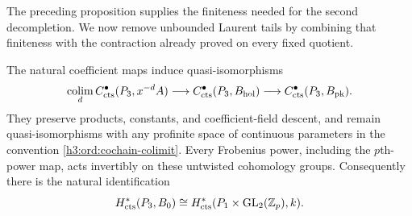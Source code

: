 The preceding proposition supplies the finiteness needed for the second
decompletion.  We now remove unbounded Laurent tails by combining that
finiteness with the contraction already proved on every fixed quotient.

\begin{theorem}\label{h3:thm:ordinary-comparison}
The natural coefficient maps induce quasi-isomorphisms
\begin{equation}\label{h3:ord:natural-comparison}
 \operatorname*{colim}_d C^\bullet_{\mathrm{cts}}(P_3,x^{-d}A)
 \longrightarrow C^\bullet_{\mathrm{cts}}(P_3,B_{\mathrm{hol}})
 \longrightarrow C^\bullet_{\mathrm{cts}}(P_3,B_{\mathrm{pk}}).
\end{equation}
They preserve products, constants, and coefficient-field descent, and
remain quasi-isomorphisms with any profinite space of continuous
parameters in the convention \eqref{h3:ord:cochain-colimit}.
Every Frobenius power, including the $p$th-power map, acts invertibly
on these untwisted cohomology groups.
Consequently there is the natural identification
\[
 H^*_{\mathrm{cts}}(P_3,B_0)
   \cong H^*_{\mathrm{cts}}(P_1\times\operatorname{GL}_2(\mathbb Z_p),k).
\]
\end{theorem}

